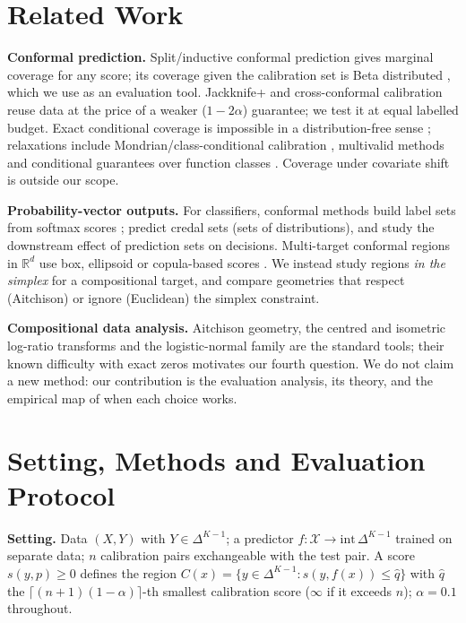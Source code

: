 \documentclass{article}
\theoremstyle{plain}
\theoremstyle{remark}
\newcommand{\simplex}{\Delta^{K-1}}
\newcommand{\R}{\mathbb{R}}
\begin{document}
\section{Related Work}
\label{sec:related}
\textbf{Conformal prediction.} Split/inductive conformal prediction \citep{papadopoulos2002,vovk2005,lei2018} gives marginal coverage for any score; its coverage given the calibration set is Beta distributed \citep{vovk2012conditional}, which we use as an evaluation tool. Jackknife+ and cross-conformal calibration \citep{barber2021jackknife,vovk2015cross} reuse data at the price of a weaker ($1-2\alpha$) guarantee; we test it at equal labelled budget. Exact conditional coverage is impossible in a distribution-free sense \citep{vovk2012conditional,barber2021limits}; relaxations include Mondrian/class-conditional calibration \citep{vovk2005,ding2023clustered}, multivalid methods \citep{jung2022batch} and conditional guarantees over function classes \citep{gibbs2023conditional}. Coverage under covariate shift \citep{tibshirani2019} is outside our scope.

\textbf{Probability-vector outputs.} For classifiers, conformal methods build label sets from softmax scores \citep{romano2020aps,angelopoulos2020raps}; \citet{javanmardi2024credal} predict credal sets (sets of distributions), and \citet{cresswell2024disparate} study the downstream effect of prediction sets on decisions. Multi-target conformal regions in $\R^d$ use box, ellipsoid or copula-based scores \citep{messoudi2021copula}. We instead study regions \emph{in the simplex} for a compositional target, and compare geometries that respect (Aitchison) or ignore (Euclidean) the simplex constraint.

\textbf{Compositional data analysis.} Aitchison geometry, the centred and isometric log-ratio transforms and the logistic-normal family \citep{aitchison1982,aitchison1980,egozcue2003} are the standard tools; their known difficulty with exact zeros motivates our fourth question. We do not claim a new method: our contribution is the evaluation analysis, its theory, and the empirical map of when each choice works.

\section{Setting, Methods and Evaluation Protocol}
\label{sec:method}
\textbf{Setting.} Data $(X,Y)$ with $Y\in\simplex$; a predictor $f:\mathcal X\to\mathrm{int}\,\simplex$ trained on separate data; $n$ calibration pairs exchangeable with the test pair. A score $s(y,p)\ge0$ defines the region $C(x)=\{y\in\simplex: s(y,f(x))\le\hat q\}$ with $\hat q$ the $\lceil(n+1)(1-\alpha)\rceil$-th smallest calibration score ($\infty$ if it exceeds $n$); $\alpha=0.1$ throughout.
\end{document}
